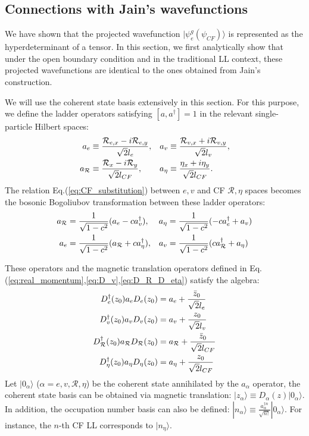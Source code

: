 \subsection{Connections with Jain's wavefunctions}\label{sec:connection_jain}
We have shown that the projected wavefunction $|\psi^g_e(\psi_{CF})\rangle$ is represented as the hyperdeterminant of a tensor. In this section, we first analytically show that under the open boundary condition and in the traditional LL context, these projected wavefunctions are identical to the ones obtained from Jain's construction.

We will use the coherent state basis extensively in this section. For this purpose, we define the ladder operators satisfying $[a,a^\dagger]=1$ in the relevant single-particle Hilbert spaces:
\begin{align}
    a_e            & \equiv\frac{\mathcal R_{e,x}-i\mathcal R_{e,y}}{\sqrt{2} l_e}, & a_v      & \equiv\frac{\mathcal R_{v,x}+i\mathcal R_{v,y}}{\sqrt{2} l_v},\notag           \\
    a_{\mathcal R} & \equiv\frac{\mathcal R_x-i\mathcal R_y}{\sqrt{2} l_{CF}},      & a_{\eta} & \equiv\frac{\mathcal \eta_{x}+i\eta_{y}}{\sqrt{2} l_{CF}}.\label{eq:ladder_op}
\end{align}
The relation Eq.(\ref{eq:CF_substitution}) between $e,v$ and CF $\mathcal R,\eta$ spaces becomes the bosonic Bogoliubov transformation between these ladder operators:
\begin{align}
    a_{\mathcal R} & =\frac{1}{\sqrt{1-c^2}}(a_e-c a_v^\dagger),                 & a_{\eta} & =\frac{1}{\sqrt{1-c^2}}(-c a_e^\dagger+a_v)\notag                                 \\
    a_e            & =\frac{1}{\sqrt{1-c^2}}(a_{\mathcal R}+c a_{\eta}^\dagger), & a_v      & =\frac{1}{\sqrt{1-c^2}}(c a_{\mathcal R}^\dagger+a_{\eta})\label{eq:a_bogoliubov}
\end{align}


These operators and the magnetic translation operators defined in Eq.(\ref{eq:real_momentum},\ref{eq:D_v},\ref{eq:D_R_D_eta}) satisfy the algebra:
\begin{align}
    D^\dagger_e(z_0) a_e D_e(z_0)                                  & = a_e + \frac{\bar z_0}{\sqrt{2}l_e}\notag               \\
    D^\dagger_v(z_0) a_v D_v(z_0)                                  & = a_v + \frac{ z_0}{\sqrt{2}l_v}\notag                   \\
    D^\dagger_{\mathcal R}(z_0) a_{\mathcal R} D_{\mathcal R}(z_0) & = a_{\mathcal R} + \frac{\bar z_0}{\sqrt{2}l_{CF}}\notag \\
    D^\dagger_{\eta}(z_0) a_{\eta} D_{\eta}(z_0)                   & = a_{\eta} + \frac{ z_0}{\sqrt{2}l_{CF}}
\end{align}
Let $|0_\alpha\rangle$ ($\alpha=e,v,\mathcal R,\eta$) be the coherent state annihilated by the $a_\alpha$ operator, the coherent state basis can be obtained via magnetic translation: $|z_\alpha\rangle\equiv D_\alpha(z)|0_\alpha\rangle$. In addition, the occupation number basis can also be defined: $|n_{\alpha}\rangle\equiv\frac{a^{\dagger n}_{\alpha}}{\sqrt{n!}}|0_{\alpha}\rangle$. For instance, the $n$-th CF LL corresponds to $|n_{\eta}\rangle$.

